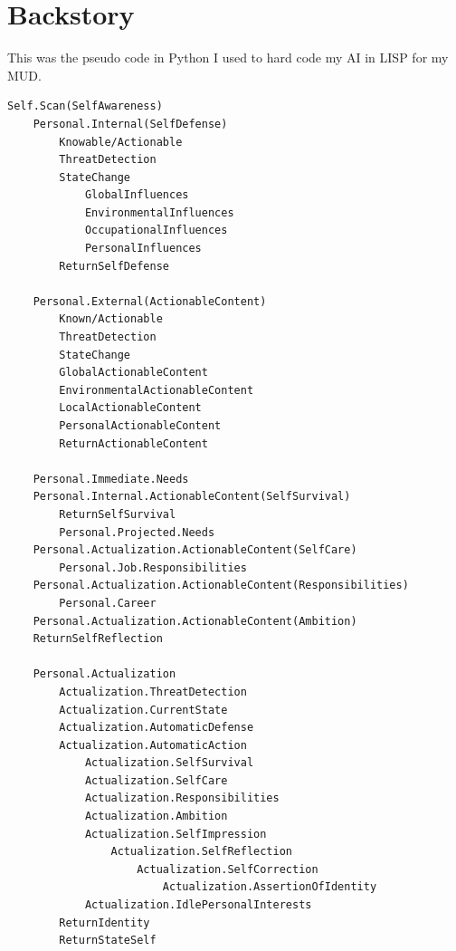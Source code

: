 \documentclass[twocolumn,10pt]{article}
\begin{document}
\section*{Backstory}
This was the pseudo code in Python I used to hard code my AI in LISP for my MUD.

\begin{lstlisting}[style=conceptmap, caption={Cognitive Agentic Structure Map}]
Self.Scan(SelfAwareness)
    Personal.Internal(SelfDefense)
        Knowable/Actionable
        ThreatDetection
        StateChange
            GlobalInfluences
            EnvironmentalInfluences
            OccupationalInfluences
            PersonalInfluences
        ReturnSelfDefense

    Personal.External(ActionableContent)
        Known/Actionable
        ThreatDetection
        StateChange
        GlobalActionableContent
        EnvironmentalActionableContent
        LocalActionableContent
        PersonalActionableContent
        ReturnActionableContent

    Personal.Immediate.Needs
    Personal.Internal.ActionableContent(SelfSurvival)
        ReturnSelfSurvival
        Personal.Projected.Needs
    Personal.Actualization.ActionableContent(SelfCare)
        Personal.Job.Responsibilities
    Personal.Actualization.ActionableContent(Responsibilities)
        Personal.Career
    Personal.Actualization.ActionableContent(Ambition)
    ReturnSelfReflection

    Personal.Actualization
        Actualization.ThreatDetection
        Actualization.CurrentState
        Actualization.AutomaticDefense
        Actualization.AutomaticAction
            Actualization.SelfSurvival
            Actualization.SelfCare
            Actualization.Responsibilities
            Actualization.Ambition
            Actualization.SelfImpression
                Actualization.SelfReflection
                    Actualization.SelfCorrection
                        Actualization.AssertionOfIdentity
            Actualization.IdlePersonalInterests
        ReturnIdentity
        ReturnStateSelf


\end{lstlisting}
\end{document}
